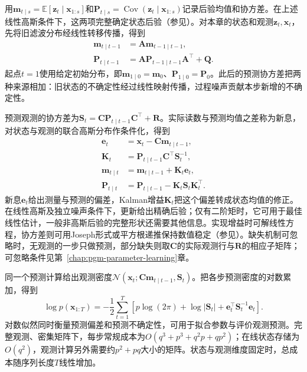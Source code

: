 用$\bm{m}_{t\mid s}=\mathbb{E}[\bm{z}_t\mid\bm{x}_{1:s}]$和$\bm{P}_{t\mid s}=\operatorname{Cov}(\bm{z}_t\mid\bm{x}_{1:s})$记录后验均值和协方差。在上述线性高斯条件下，这两项完整确定状态后验（参见）。对本章的状态和观测$\bm z_t,\bm x_t$，先将旧滤波分布经线性转移传播，得到
\begin{equation}
  \begin{aligned}
    \bm{m}_{t\mid t-1}&=\bm{A}\bm{m}_{t-1\mid t-1},\\
    \bm{P}_{t\mid t-1}
      &=\bm{A}\bm{P}_{t-1\mid t-1}\bm{A}^{\top}
        +\bm{Q}.
  \end{aligned}
  \label{eq:pgm-dynamic-kalman-predict}
\end{equation}
起点$t=1$使用给定初始分布，即$\bm{m}_{1\mid0}=\bm{m}_0$、$\bm{P}_{1\mid0}=\bm{P}_0$。此后的预测协方差把两种来源相加：旧状态的不确定性经过线性映射传播，过程噪声贡献本步新增的不确定性。

预测观测的协方差为$\bm S_t=\bm C\bm P_{t\mid t-1}\bm C^\top+\bm R$。实际读数与预测均值之差称为新息，对状态与观测的联合高斯分布作条件化，得到
\begin{equation}
  \begin{aligned}
    \bm{e}_t&=\bm{x}_t-\bm{C}\bm{m}_{t\mid t-1},\\
    \bm{K}_t&=\bm{P}_{t\mid t-1}\bm{C}^{\top}\bm{S}_t^{-1},\\
    \bm{m}_{t\mid t}
      &=\bm{m}_{t\mid t-1}+\bm{K}_t\bm{e}_t,\\
    \bm{P}_{t\mid t}
      &=\bm{P}_{t\mid t-1}
        -\bm{K}_t\bm{S}_t\bm{K}_t^{\top}.
  \end{aligned}
  \label{eq:pgm-dynamic-kalman-update}
\end{equation}
新息$\bm e_t$给出测量与预测的偏差，Kalman增益$\bm K_t$把这个偏差转成状态均值的修正。在线性高斯及独立噪声条件下，更新给出精确后验；仅有二阶矩时，它可用于最佳线性估计，一般非高斯后验的完整形状还需要其他信息。实现增益时可解线性方程，协方差则可用Joseph形式或平方根递推保持数值稳定（参见）。缺失机制可忽略时，无观测的一步只做预测，部分缺失则取$\bm C$的实际观测行与$\bm R$的相应子矩阵；可忽略条件见第~\ref{chap:pgm-parameter-learning}章。

同一个预测计算给出观测密度$\mathcal N(\bm{x}_t;\bm{C}\bm{m}_{t\mid t-1},\bm{S}_t)$。把各步预测密度的对数累加，得到
\begin{equation}
  \log p(\bm{x}_{1:T})
    =-\frac12\sum_{t=1}^{T}
      \left[
        p\log(2\pi)+\log|\bm{S}_t|
        +\bm{e}_t^\top\bm{S}_t^{-1}\bm{e}_t
      \right].
  \label{eq:pgm-dynamic-kalman-likelihood}
\end{equation}
对数似然同时衡量预测偏差和预测不确定性，可用于拟合参数与评价观测预测。完整观测、密集矩阵下，每步常规成本为$O(q^3+p^3+q^2p+qp^2)$；在线状态存储为$O(q^2)$，观测计算另外需要约$p^2+pq$大小的矩阵。状态与观测维度固定时，总成本随序列长度$T$线性增加。

